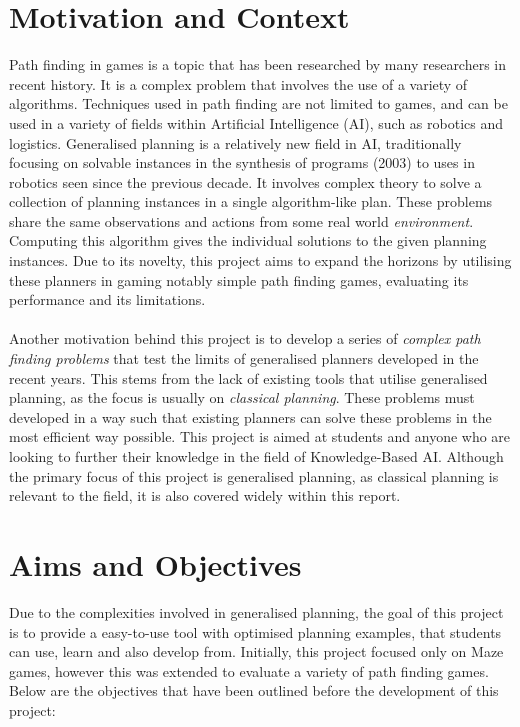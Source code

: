 \section{Motivation and Context}
Path finding in games is a topic that has been researched by many researchers in recent history. It is a complex problem that involves the use of a variety of algorithms. Techniques used in path finding are not limited to games, and can be used in a variety of fields within Artificial Intelligence (AI), such as robotics and logistics. Generalised planning is a relatively new field in AI, traditionally focusing on solvable instances in the synthesis of programs (2003)\cite{jimenez_review_2019} to uses in robotics seen since the previous decade. It involves complex theory to solve a collection of planning instances in a single algorithm-like plan. These problems share the same observations and actions from some real world \textit{environment}. Computing this algorithm gives the individual solutions to the given planning instances. Due to its novelty, this project aims to expand the horizons by utilising these planners in gaming notably simple path finding games, evaluating its performance and its limitations. \\\\
Another motivation behind this project is to develop a series of \textit{complex path finding problems} that test the limits of generalised planners developed in the recent years. This stems from the lack of existing tools that utilise generalised planning, as the focus is usually on \textit{classical planning}. These problems must developed in a way such that existing planners can solve these problems in the most efficient way possible. This project is aimed at students and anyone who are looking to further their knowledge in the field of Knowledge-Based AI. Although the primary focus of this project is generalised planning, as classical planning is relevant to the field, it is also covered widely within this report. 


\newpage
\section{Aims and Objectives}
Due to the complexities involved in generalised planning, the goal of this project is to provide a easy-to-use tool with optimised planning examples, that students can use, learn and also develop from. Initially, this project focused only on Maze games, however this was extended to evaluate a variety of path finding games. Below are the objectives that have been outlined before the development of this project:

